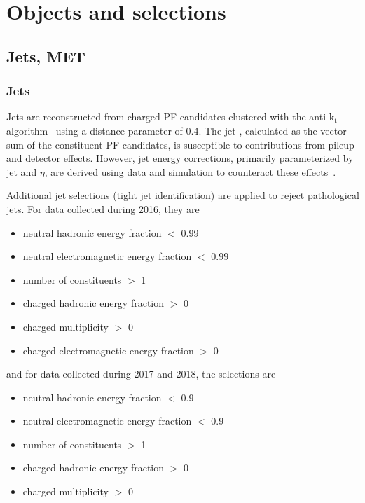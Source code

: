 \chapter{Objects and selections}

\section{Jets, MET}

\subsection{Jets}
Jets are reconstructed from charged PF candidates clustered with the
anti-$\mathrm{k_t}$ algorithm~\cite{CMS:Cacciari2008gp, CMS:Cacciari2011ma}
using a distance parameter of 0.4. The jet \pt, calculated as the vector sum
of the constituent PF candidates, is susceptible to contributions from pileup
and detector effects. However, jet energy corrections, primarily
parameterized by jet \pt and $\eta$, are derived using data and simulation to
counteract these effects~\cite{CMS:Khachatryan2016kdb, CMS:PASJME16003}.

Additional jet selections (tight jet identification) are applied to reject
pathological jets. For data collected during 2016, they are
\begin{itemize}
    \item neutral hadronic energy fraction $<$ 0.99
    \item neutral electromagnetic energy fraction $<$ 0.99
    \item number of constituents $>$ 1
    \item charged hadronic energy fraction $>$ 0
    \item charged multiplicity $>$ 0
    \item charged electromagnetic energy fraction $>$ 0
\end{itemize}
\noindent and for data collected during 2017 and 2018, the selections are
\begin{itemize}
    \item neutral hadronic energy fraction $<$ 0.9
    \item neutral electromagnetic energy fraction $<$ 0.9
    \item number of constituents $>$ 1
    \item charged hadronic energy fraction $>$ 0
    \item charged multiplicity $>$ 0
\end{itemize}


